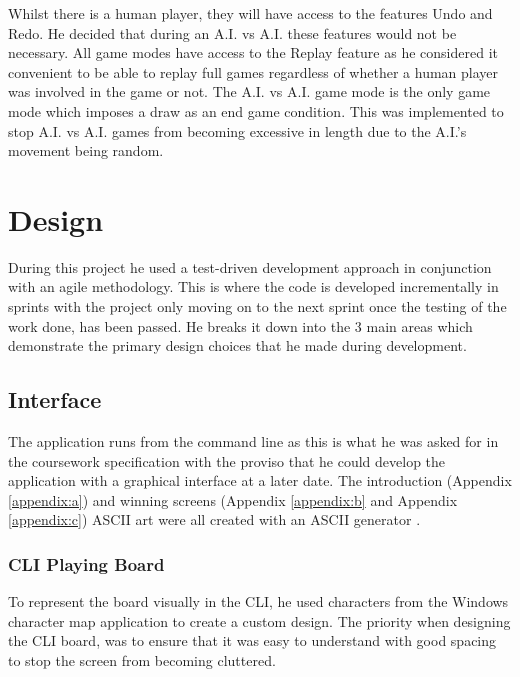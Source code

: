 \documentclass[10pt, a4paper]{article}
\begin{document}
 Whilst there is a human player, they will have access to the features Undo and Redo. He decided that during an A.I. vs A.I. these features would not be necessary. All game modes have access to the Replay feature as he considered it convenient to be able to replay full games regardless of whether a human player was involved in the game or not.
 \newline
 The A.I. vs A.I. game mode is the only game mode which imposes a draw as an end game condition. This was implemented to stop A.I. vs A.I. games from becoming excessive in length due to the A.I.'s movement being random.
 
 
 \section{Design}   
 During this project he used a test-driven development approach in conjunction with an agile methodology. This is where the code is developed incrementally in sprints with the project only moving on to the next sprint once the testing of the work done, has been passed. He breaks it down into the 3 main areas which demonstrate the primary design choices that he made during development.
 
 
 \subsection{Interface}
 The application runs from the command line as this is what he was asked for in the coursework specification with the proviso that he could develop the application with a graphical interface at a later date. The introduction (Appendix \ref{appendix:a}) and winning screens (Appendix \ref{appendix:b} and Appendix \ref{appendix:c}) ASCII art were all created with an ASCII generator \cite{seyfferth}.
 
 
 \subsubsection{CLI Playing Board}
 To represent the board visually in the CLI, he used characters from the Windows character map application to create a custom design. The priority when designing the CLI board, was to ensure that it was easy to understand with good spacing to stop the screen from becoming cluttered.
 
\end{document}
